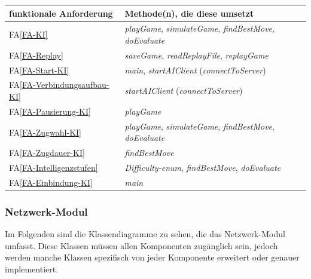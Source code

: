 \documentclass[12pt]{article}
\newcounter{fa}
\newcommand{\mfaref}[1]{FA\ref{#1}}
\begin{document}
\begin{tabularx}{\linewidth}{l|X}
	\textbf{funktionale Anforderung} & \textbf{Methode(n), die diese umsetzt} \\ \hline
	\mfaref{FA-KI} & \textit{playGame}, \textit{simulateGame}, \textit{findBestMove}, \textit{doEvaluate} \\ 
	\mfaref{FA-Replay} & \textit{saveGame}, \textit{readReplayFile}, \textit{replayGame} \\ 
	\mfaref{FA-Start-KI} & \textit{main}, \textit{startAIClient} (\textit{connectToServer}) \\ 
	\mfaref{FA-Verbindungsaufbau-KI} & \textit{startAIClient} (\textit{connectToServer}) \\
	\mfaref{FA-Pausierung-KI} & \textit{playGame} \\
	\mfaref{FA-Zugwahl-KI} & \textit{playGame}, \textit{simulateGame}, \textit{findBestMove}, \textit{doEvaluate} \\ 
	\mfaref{FA-Zugdauer-KI} & \textit{findBestMove} \\ 
	\mfaref{FA-Intelligenzstufen} & \textit{Difficulty-enum}, \textit{findBestMove}, \textit{doEvaluate} \\
	\mfaref{FA-Einbindung-KI} & \textit{main} \\
\end{tabularx}

\vspace{0.5cm}

\subsubsection{Netzwerk-Modul}
Im Folgenden sind die Klassendiagramme zu sehen, die das Netzwerk-Modul umfasst. Diese Klassen müssen allen Komponenten zugänglich sein, jedoch werden manche Klassen spezifisch von jeder Komponente erweitert oder genauer implementiert. \\ 
\end{document}
